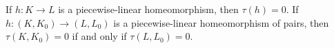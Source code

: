 If $h: K \to L$ is a piecewise-linear homeomorphism, then $\tau(h) = 0$. If $h: (K, K_0) \to (L, L_0)$ is a piecewise-linear homeomorphism of pairs, then $\tau(K, K_0) = 0$ if and only if $\tau(L, L_0) = 0$.
